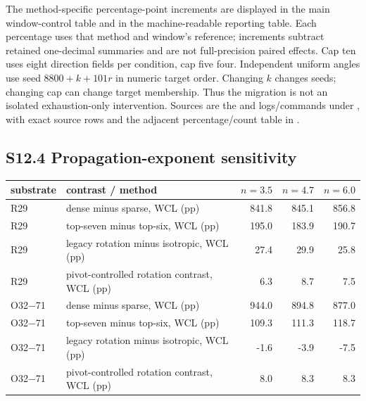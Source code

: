 \documentclass[journal,onecolumn,10pt]{IEEEtran}
\begin{document}


The method-specific percentage-point increments are displayed in the main window-control table and in the machine-readable reporting table. Each percentage uses that method and window's reference; increments subtract retained one-decimal summaries and are not full-precision paired effects. Cap ten uses eight direction fields per condition, cap five four. Independent uniform angles use seed $8800+k+101r$ in numeric target order. Changing $k$ changes seeds; changing cap can change target membership. Thus the migration is not an isolated exhaustion-only intervention. Sources are the  and  logs/commands under , with exact source rows and the adjacent percentage/count table in .
\subsection*{S12.4 Propagation-exponent sensitivity}

\begin{center}\begin{minipage}{\textwidth}\centering
{}

\begin{tabular}{@{}llrrr@{}}
\toprule
substrate & contrast / method & $n=3.5$ & $n=4.7$ & $n=6.0$ \\
\midrule

R29 & dense minus sparse, WCL (pp) & 841.8 & 845.1 & 856.8 \\
R29 & top-seven minus top-six, WCL (pp) & 195.0 & 183.9 & 190.7 \\
R29 & legacy rotation minus isotropic, WCL (pp) & 27.4 & 29.9 & 25.8 \\
R29 & pivot-controlled rotation contrast, WCL (pp) & 6.3 & 8.7 & 7.5 \\
O32$-$71 & dense minus sparse, WCL (pp) & 944.0 & 894.8 & 877.0 \\
O32$-$71 & top-seven minus top-six, WCL (pp) & 109.3 & 111.3 & 118.7 \\
O32$-$71 & legacy rotation minus isotropic, WCL (pp) & -1.6 & -3.9 & -7.5 \\
O32$-$71 & pivot-controlled rotation contrast, WCL (pp) & 8.0 & 8.3 & 8.3 \\
\bottomrule
\end{tabular}
\end{minipage}\end{center}
\end{document}
